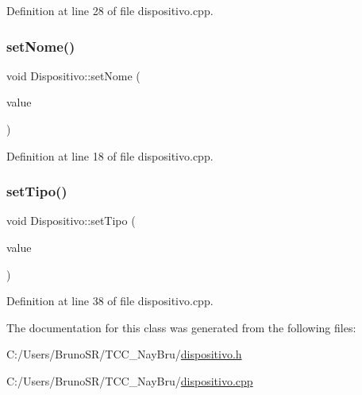 Definition at line 28 of file dispositivo.\+cpp.

\hypertarget{class_dispositivo_a8bafe761c02216dd6bc7465eb4ff0064}{}\label{class_dispositivo_a8bafe761c02216dd6bc7465eb4ff0064} 
\subsubsection{\texorpdfstring{set\+Nome()}{setNome()}}
{\footnotesize\ttfamily void Dispositivo\+::set\+Nome (\begin{DoxyParamCaption}\item[{const Q\+String \&}]{value }\end{DoxyParamCaption})}



Definition at line 18 of file dispositivo.\+cpp.

\hypertarget{class_dispositivo_ada239ce7b043c5ae4d426cf4f1d0cf8f}{}\label{class_dispositivo_ada239ce7b043c5ae4d426cf4f1d0cf8f} 
\subsubsection{\texorpdfstring{set\+Tipo()}{setTipo()}}
{\footnotesize\ttfamily void Dispositivo\+::set\+Tipo (\begin{DoxyParamCaption}\item[{const \hyperlink{classtipod}{tipod} \&}]{value }\end{DoxyParamCaption})}



Definition at line 38 of file dispositivo.\+cpp.



The documentation for this class was generated from the following files\+:\begin{DoxyCompactItemize}
\item 
C\+:/\+Users/\+Bruno\+S\+R/\+T\+C\+C\+\_\+\+Nay\+Bru/\hyperlink{dispositivo_8h}{dispositivo.\+h}\item 
C\+:/\+Users/\+Bruno\+S\+R/\+T\+C\+C\+\_\+\+Nay\+Bru/\hyperlink{dispositivo_8cpp}{dispositivo.\+cpp}\end{DoxyCompactItemize}

